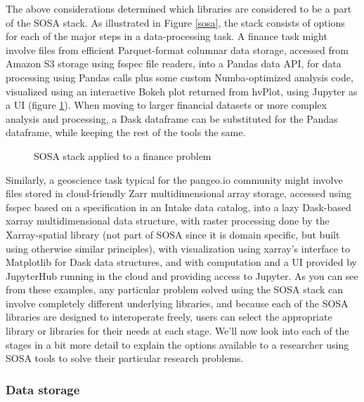 The above considerations determined which libraries are considered to be a part of the SOSA stack. As illustrated in Figure \ref{sosa}, the stack consists of options for each of the major steps in a data-processing task. A finance task might involve files from efficient Parquet-format columnar data storage, accessed from Amazon S3 storage using fsspec file readers, into a Pandas data API, for data processing using Pandas calls plus some custom Numba-optimized analysis code, visualized using an interactive Bokeh plot returned from hvPlot, using Jupyter as a UI (figure \ref{sosa-finance}). When moving to larger financial datasets or more complex analysis and processing, a Dask dataframe can be substituted for the Pandas dataframe, while keeping the rest of the tools the same.
\begin{figure}[h]
    \noindent{}
    \caption{SOSA stack applied to a finance problem\label{sosa-finance}}
\end{figure}
Similarly, a geoscience task typical for the pangeo.io community might involve files stored in cloud-friendly Zarr multidimensional array storage, accessed using fsspec based on a specification in an Intake data catalog, into a lazy Dask-based xarray multidimensional data structure, with raster processing done by the Xarray-spatial library (not part of SOSA since it is domain specific, but built using otherwise similar principles), with visualization using xarray's interface to Matplotlib for Dask data structures, and with computation and a UI provided by JupyterHub running in the cloud and providing access to Jupyter.
As you can see from these examples, any particular problem solved using the SOSA stack can involve completely different underlying libraries, and because each of the SOSA libraries are designed to interoperate freely, users can select the appropriate library or libraries for their needs at each stage. We'll now look into each of the stages in a bit more detail to explain the options available to a researcher using SOSA tools to solve their particular research problems.


\subsubsection{Data storage}

